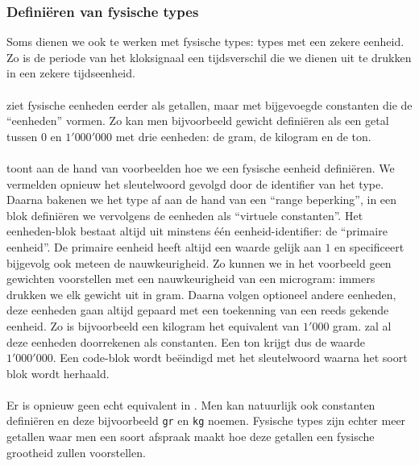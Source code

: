 \subsubsection{Defini\"eren van fysische types}
Soms dienen we ook te werken met fysische types: types met een zekere eenheid. Zo is de periode van het kloksignaal een tijdsverschil die we dienen uit te drukken in een zekere tijdseenheid.

\paragraph{}
\tvhdl{} ziet fysische eenheden eerder als getallen, maar met bijgevoegde constanten die de ``eenheden'' vormen. Zo kan men bijvoorbeeld gewicht defini\"eren als een getal tussen $0$ en $1'000'000$ met drie eenheden: de gram, de kilogram en de ton.

\paragraph{}
 toont aan de hand van voorbeelden hoe we een fysische eenheid defini\"eren. We vermelden opnieuw het sleutelwoord  gevolgd door de identifier van het type. Daarna bakenen we het type af aan de hand van een ``range beperking'', in een  blok defini\"eren we vervolgens de eenheden als ``virtuele constanten''. Het eenheden-blok bestaat altijd uit minstens \'e\'en eenheid-identifier: de ``primaire eenheid''. De primaire eenheid heeft altijd een waarde gelijk aan $1$ en specificeert bijgevolg ook meteen de nauwkeurigheid. Zo kunnen we in het voorbeeld geen gewichten voorstellen met een nauwkeurigheid van een microgram: immers drukken we elk gewicht uit in gram. Daarna volgen optioneel andere eenheden, deze eenheden gaan altijd gepaard met een toekenning van een reeds gekende eenheid. Zo is bijvoorbeeld een kilogram het equivalent van $1'000$ gram. \tvhdl{} zal al deze eenheden doorrekenen als constanten. Een ton krijgt dus de waarde $1'000'000$. Een code-blok wordt be\"eindigd met het  sleutelwoord waarna het soort blok wordt herhaald.


\paragraph{}
Er is opnieuw geen echt equivalent in \tjava{}. Men kan natuurlijk ook constanten defini\"eren en deze bijvoorbeeld \texttt{gr} en \texttt{kg} noemen. Fysische types zijn echter meer getallen waar men een soort afspraak maakt hoe deze getallen een fysische grootheid zullen voorstellen.


